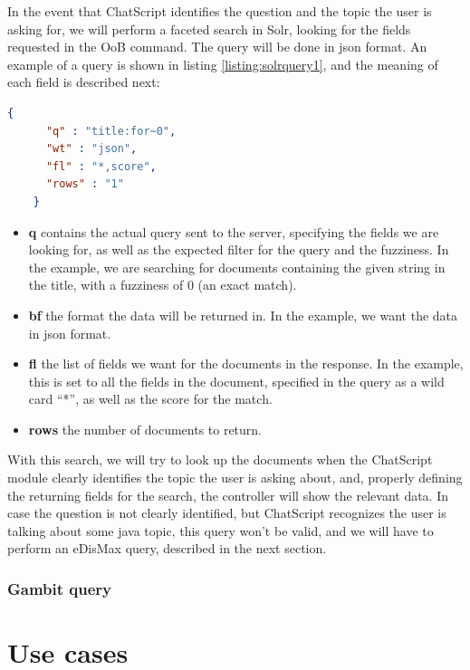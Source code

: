 In the event that ChatScript identifies the question and the topic the user is asking for, we will perform a faceted search in Solr, looking for the fields requested in the \ac{OoB} command. The query will be done in json format. An example of a query is shown in listing \ref{listing:solrquery1}, and the meaning of each field is described next:

\begin{center} 
  \begin{lstlisting}[language=json, caption=Example json query for Solr, label=listing:solrquery1]
    {
      "q" : "title:for~0",
      "wt" : "json",
      "fl" : "*,score",
      "rows" : "1"
    }  
  \end{lstlisting}
\end{center}

\begin{itemize}
 \item \textbf{q} contains the actual query sent to the server, specifying the fields we are looking for, as well as the expected filter for the query and the fuzziness. In the example, we are searching for documents containing the given string in the title, with a fuzziness of 0 (an exact match).
 \item \textbf{bf} the format the data will be returned in. In the example, we want the data in json format.
 \item \textbf{fl} the list of fields we want for the documents in the response. In the example, this is set to all the fields in the document, specified in the query as a wild card ``*'', as well as the score for the match.
 \item \textbf{rows} the number of documents to return.
\end{itemize}

With this search, we will try to look up the documents when the ChatScript module clearly identifies the topic the user is asking about, and, properly defining the returning fields for the search, the controller will show the relevant data. In case the question is not clearly identified, but ChatScript recognizes the user is talking about some java topic, this query won't be valid, and we will have to perform an eDisMax query, described in the next section.

\subsubsection{Gambit query}
\label{subsec:solrgambit}


\section{Use cases}

